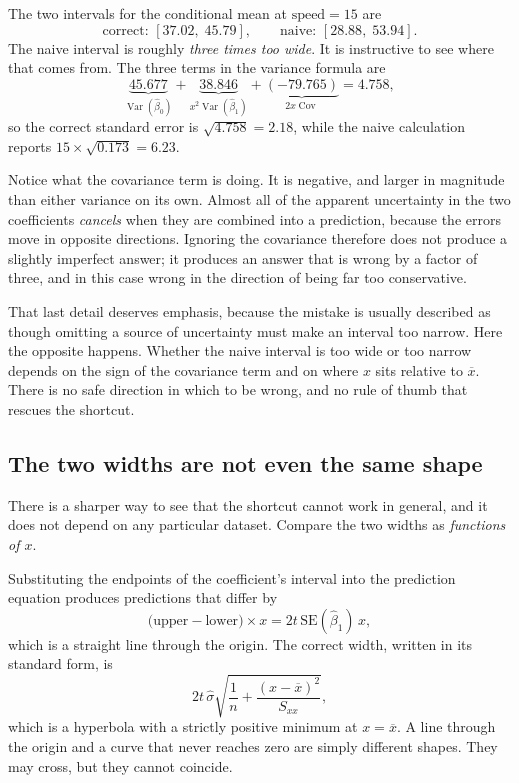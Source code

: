 \documentclass[11pt]{report}
\newcommand{\Var}{\operatorname{Var}}
\begin{document}
The two intervals for the conditional mean at \(\text{speed}=15\) are
\[
\text{correct: }[37.02,\;45.79],
\qquad
\text{naive: }[28.88,\;53.94].
\]
The naive interval is roughly \emph{three times too wide}. It is instructive to see where that comes from. The three terms in the variance formula are
\[
\underbrace{45.677}_{\Var(\widehat{\beta}_0)}
+
\underbrace{38.846}_{x^2\Var(\widehat{\beta}_1)}
+
\underbrace{(-79.765)}_{2x\operatorname{Cov}}
=
4.758,
\]
so the correct standard error is \(\sqrt{4.758}=2.18\), while the naive calculation reports \(15\times\sqrt{0.173}=6.23\).

Notice what the covariance term is doing. It is negative, and larger in magnitude than either variance on its own. Almost all of the apparent uncertainty in the two coefficients \emph{cancels} when they are combined into a prediction, because the errors move in opposite directions. Ignoring the covariance therefore does not produce a slightly imperfect answer; it produces an answer that is wrong by a factor of three, and in this case wrong in the direction of being far too conservative.

That last detail deserves emphasis, because the mistake is usually described as though omitting a source of uncertainty must make an interval too narrow. Here the opposite happens. Whether the naive interval is too wide or too narrow depends on the sign of the covariance term and on where \(x\) sits relative to \(\overline{x}\). There is no safe direction in which to be wrong, and no rule of thumb that rescues the shortcut.

\subsection{The two widths are not even the same shape}

There is a sharper way to see that the shortcut cannot work in general, and it does not depend on any particular dataset. Compare the two widths as \emph{functions of \(x\)}.

Substituting the endpoints of the coefficient's interval into the prediction equation produces predictions that differ by
\[
\big(\text{upper}-\text{lower}\big)\times x
=
2t\,\mathrm{SE}(\widehat{\beta}_1)\,x ,
\]
which is a straight line through the origin. The correct width, written in its standard form, is
\[
2t\,\widehat{\sigma}\sqrt{\frac{1}{n}+\frac{(x-\overline{x})^2}{S_{xx}}},
\]
which is a hyperbola with a strictly positive minimum at \(x=\overline{x}\). A line through the origin and a curve that never reaches zero are simply different shapes. They may cross, but they cannot coincide.
\end{document}
